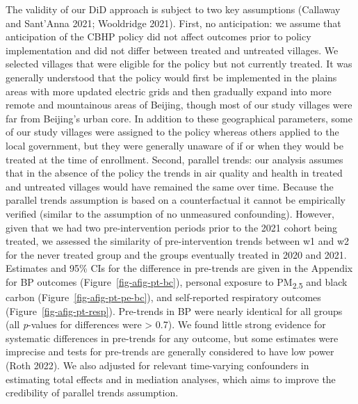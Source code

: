 \documentclass[
  letterpaper,
  DIV=11,
  numbers=noendperiod]{scrartcl}
\begin{document}
The validity of our DiD approach is subject to two key assumptions
(Callaway and Sant'Anna 2021; Wooldridge 2021). First, no anticipation:
we assume that anticipation of the CBHP policy did not affect outcomes
prior to policy implementation and did not differ between treated and
untreated villages. We selected villages that were eligible for the
policy but not currently treated. It was generally understood that the
policy would first be implemented in the plains areas with more updated
electric grids and then gradually expand into more remote and
mountainous areas of Beijing, though most of our study villages were far
from Beijing's urban core. In addition to these geographical parameters,
some of our study villages were assigned to the policy whereas others
applied to the local government, but they were generally unaware of if
or when they would be treated at the time of enrollment. Second,
parallel trends: our analysis assumes that in the absence of the policy
the trends in air quality and health in treated and untreated villages
would have remained the same over time. Because the parallel trends
assumption is based on a counterfactual it cannot be empirically
verified (similar to the assumption of no unmeasured confounding).
However, given that we had two pre-intervention periods
prior to the 2021 cohort being treated, we assessed the similarity of
pre-intervention trends between w1 and w2 for the never treated group
and the groups eventually treated in 2020 and 2021. Estimates and 95\%
CIs for the difference in pre-trends are given in the Appendix for BP
outcomes (Figure~\ref{fig-afig-pt-bc}), personal exposure to
PM\textsubscript{2.5} and black carbon (Figure~\ref{fig-afig-pt-pe-bc}),
and self-reported respiratory outcomes (Figure~\ref{fig-afig-pt-resp}).
Pre-trends in BP were nearly identical for all groups (all
\emph{p}-values for differences were \textgreater{} 0.7). We found
little strong evidence for systematic differences in pre-trends for any
outcome, but some estimates were imprecise and tests for pre-trends are
generally considered to have low power (Roth 2022). We also adjusted for
relevant time-varying confounders in estimating total effects and in
mediation analyses, which aims to improve the credibility of parallel
trends assumption.
\end{document}
